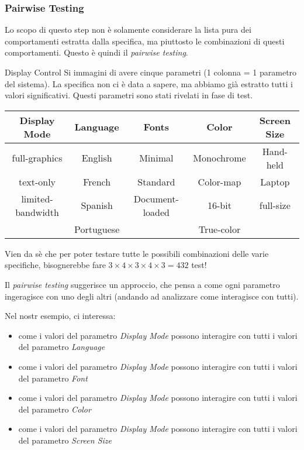 \subsubsection{Pairwise Testing}

Lo scopo di questo step non è solamente considerare la lista pura dei comportamenti estratta dalla specifica, ma piuttosto le combinazioni di questi comportamenti. Questo è quindi il \textit{pairwise testing}.

\begin{example}{}{Display Control}
    Si immagini di avere cinque parametri (1 colonna = 1 parametro del sistema). La specifica non ci è data a sapere, ma abbiamo già estratto tutti i valori significativi. Questi parametri sono stati rivelati in fase di test. 

    \begin{tabular}{c | c | c | c | c}
        Display Mode & Language & Fonts & Color & Screen Size \\ \hline
        full-graphics & English & Minimal & Monochrome & Hand-held \\
        text-only & French & Standard & Color-map & Laptop \\
        limited-bandwidth & Spanish & Document-loaded & 16-bit & full-size \\
        & Portuguese & & True-color &
    \end{tabular}

    Vien da sè che per poter testare tutte le possibili combinazioni delle varie specifiche, bisognerebbe fare $3 \times 4 \times 3 \times 4 \times 3 = 432$ test!

    Il \textit{pairwise testing} suggerisce un approccio, che pensa a come ogni parametro ingeragisce con uno degli altri (andando ad analizzare come interagisce con tutti).

    Nel nostr esempio, ci interessa: \begin{itemize}
        \item come i valori del parametro \textit{Display Mode} possono interagire con tutti i valori del parametro \textit{Language}
        \item come i valori del parametro \textit{Display Mode} possono interagire con tutti i valori del parametro \textit{Font}
        \item come i valori del parametro \textit{Display Mode} possono interagire con tutti i valori del parametro \textit{Color}
        \item come i valori del parametro \textit{Display Mode} possono interagire con tutti i valori del parametro \textit{Screen Size}
    \end{itemize}


\end{example}
